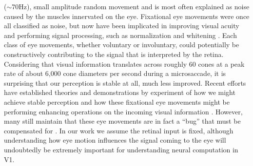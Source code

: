 ($\sim$70Hz), small amplitude random movement and is most often explained as noise caused by the muscles innervated on the eye. Fixational eye movements were once all classified as noise, but now have been implicated in improving visual acuity \parencite{ratnam2017benefits, rucci2007miniature} and performing signal processing, such as normalization and whitening \parencite{aytekin2014visual}. Each class of eye movements, whether voluntary or involuntary, could potentially be constructively contributing to the signal that is interpreted by the retina. Considering that visual information translates across roughly 60 cones at a peak rate of about 6,000 cone diameters per second during a microsaccade, it is surprising that our perception is stable at all, much less improved. Recent efforts have established theories and demonstrations by experiment of how we might achieve stable perception \parencite{arathorn2013unstable, bridgeman2010brain, murakami1998jitter, burak2010bayesian} and how these fixational eye movements might be performing enhancing operations on the incoming visual information \parencite{ahissar2012seeing, mostofi2016visual, kenyon2004correlated}. However, many still maintain that these eye movements are in fact a ``bug'' that must be compensated for \parencite{packer1992blurring, kowler1979miniature, engbert2011integrated}. In our work we assume the retinal input is fixed, although understanding how eye motion influences the signal coming to the eye will undoubtedly be extremely important for understanding neural computation in V1.


